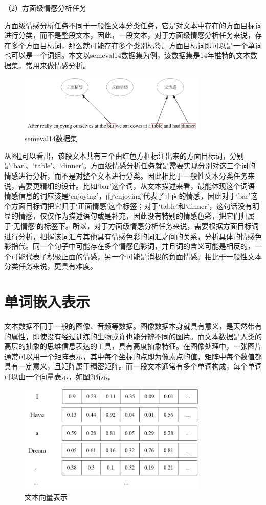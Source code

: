 （2）方面级情感分析任务

方面级情感分析任务不同于一般性文本分类任务，它是对文本中存在的方面目标词进行分类，而不是整段文本，因此，一段文本，对于方面级情感分析任务来说，存在多个方面目标词，那么就可能存在多个类别标签。方面目标词即可以是一个单词也可以是一个词组。本文以semeval14数据集为例，该数据集是14年推特的文本数据集，常用来做情感分析。
\begin{figure}[htb]%
	\setlength{\belowcaptionskip}{0pt}
	\centering
	\includegraphics[width=0.8\textwidth]{pic/2-2.png}
	\caption{semeval14数据集}
	\label{semeval14datasets}
\end{figure}

从图\ref{semeval14datasets}可以看出，该段文本共有三个由红色方框标注出来的方面目标词，分别是‘bar’、‘table’、‘dinner’。方面级情感分析任务就是需要实现分别对这三个词的情感进行分析，而不是对整个文本进行分类。因此相比于一般性文本分类任务来说，需要更精细的设计。比如‘bar’这个词，从文本描述来看，最能体现这个词语情感信息的词应该是‘enjoying’，而‘enjoying’代表了正面的情感，因此对于‘bar’这个方面目标词把它归于‘正面情感’这个标签；对于‘table’和‘dinner’，这句话没有明显的情感，仅仅作为描述语句或是补充，因此没有特别的情感色彩，把它们归属于‘无情感’的标签下。所以，对于方面级情感分析任务来说，需要根据方面目标词进行分析，把握该词汇与其他具有情感色彩的词汇之间的关系，分析具体的情感色彩指代。同一个句子中可能存在多个情感色彩词，并且词的含义可能是相反的，一个可能代表了积极正面的情感，另一个可能是消极的负面情感。相比于一般性文本分类任务来说，更具有难度。
\section{单词嵌入表示}
文本数据不同于一般的图像、音频等数据。图像数据本身就具有意义，是天然带有的属性，即使没有经过训练的生物或许也能分辨不同的图片。而文本数据是人类的高层的抽象的思维信息表达的工具，具有高度抽象特征。在图像处理中，一张图片通常可以用一个矩阵表示，其中每个坐标的点即为像素点的值，矩阵中每个数值都具有一定意义，且矩阵属于稠密矩阵。而一段文本通常有多个单词构成，每个单词可以由一个向量表示，如图\ref{textEmb}所示。
\begin{figure}[htb]%
	\setlength{\belowcaptionskip}{0pt}
	\centering
	\includegraphics[width=0.8\textwidth]{pic/2-3.png}
	\caption{文本向量表示}
	\label{textEmb}
\end{figure}

